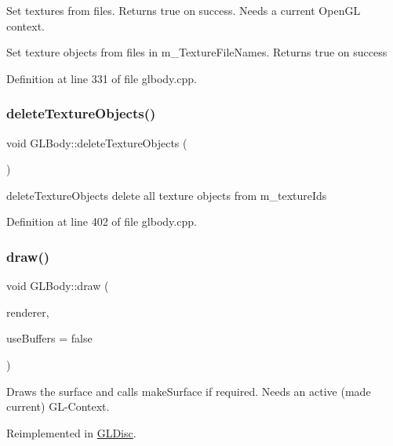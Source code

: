 Set textures from files. Returns true on success. Needs a current Open\+GL context.

Set texture objects from files in m\+\_\+\+Texture\+File\+Names. Returns true on success 

Definition at line 331 of file glbody.\+cpp.

\mbox{\label{class_g_l_body_abf93cad4d78b161c63f2990ef3f618e4}} 
\subsubsection{\texorpdfstring{deleteTextureObjects()}{deleteTextureObjects()}}
{\footnotesize\ttfamily void G\+L\+Body\+::delete\+Texture\+Objects (\begin{DoxyParamCaption}{ }\end{DoxyParamCaption})}



delete\+Texture\+Objects delete all texture objects from m\+\_\+texture\+Ids 



Definition at line 402 of file glbody.\+cpp.

\mbox{\label{class_g_l_body_aaeb47c0a8cfc36caed81fc139c42ddfc}} 
\subsubsection{\texorpdfstring{draw()}{draw()}}
{\footnotesize\ttfamily void G\+L\+Body\+::draw (\begin{DoxyParamCaption}\item[{\mbox{\hyperlink{class_g_l_e_s_renderer}{G\+L\+E\+S\+Renderer}} $\ast$}]{renderer,  }\item[{bool}]{use\+Buffers = {\ttfamily false} }\end{DoxyParamCaption})\hspace{0.3cm}{\ttfamily [virtual]}}

Draws the surface and calls make\+Surface if required. Needs an active (made current) G\+L-\/\+Context. 

Reimplemented in \mbox{\hyperlink{class_g_l_disc_a7fca90525cba1fb6099d70730375cc6e}{G\+L\+Disc}}.



